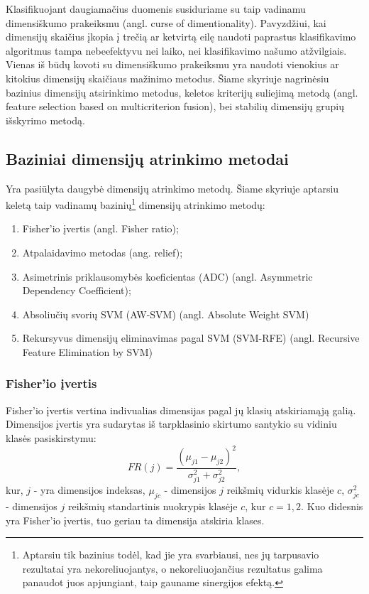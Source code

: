 Klasifikuojant daugiamačius duomenis susiduriame su taip vadinamu dimensiškumo
prakeiksmu (angl. curse of dimentionality). Pavyzdžiui, kai dimensijų skaičius įkopia į
trečią ar ketvirtą eilę naudoti paprastus klasifikavimo algoritmus tampa
nebeefektyvu nei laiko, nei klasifikavimo našumo atžvilgiais. Vienas iš būdų
kovoti su dimensiškumo prakeiksmu
yra naudoti vienokius ar kitokius dimensijų skaičiaus mažinimo metodus. Šiame
skyriuje nagrinėsiu bazinius dimensijų atsirinkimo metodus, keletos 
kriterijų suliejimą metodą (angl.
feature selection based on multicriterion fusion)\cite{yang2011robust}, bei
stabilių dimensijų grupių išskyrimo metodą\cite{Loscalzo:2009:CGS:1557019.1557084}.

\subsection{Baziniai dimensijų atrinkimo metodai}

Yra pasiūlyta daugybė dimensijų atrinkimo metodų. Šiame skyriuje aptarsiu
keletą taip vadinamų bazinių\footnote{Aptarsiu tik bazinius todėl, kad jie yra 
svarbiausi, nes jų tarpusavio rezultatai yra nekoreliuojantys, o nekoreliuojančius
rezultatus galima panaudot juos apjungiant, taip gauname sinergijos efektą.}
dimensijų atrinkimo metodų: 
\begin{enumerate}
 \item Fisher'io įvertis (angl. Fisher ratio)\cite{Pavlidis:2001:GFC:369133.369228};
 \item Atpalaidavimo metodas\cite{DBLP:journals/ml/Robnik-SikonjaK03} (ang. relief);
 \item Asimetrinis priklausomybės koeficientas\cite{Shannon:2001:MTC:584091.584093} (ADC) (angl.
 Asymmetric Dependency Coefficient);
 \item Absoliučių svorių SVM\cite{vapnik2000nature} (AW-SVM) (angl. Absolute Weight SVM)
 \item Rekursyvus dimensijų eliminavimas pagal SVM\cite{Guyon:2002:GSC:599613.599671} (SVM-RFE) (angl. Recursive
 Feature Elimination by SVM)
\end{enumerate}

\subsubsection{Fisher'io įvertis}

Fisher'io įvertis vertina indivualias dimensijas pagal jų klasių atskiriamąją 
galią. Dimensijos įvertis yra sudarytas iš tarpklasinio skirtumo santykio su 
vidiniu klasės pasiskirstymu:
\begin{equation}
 FR(j) = \frac{(\mu_{j1} - \mu_{j2})^2}{\sigma_{j1}^2 + \sigma_{j2}^2},
\end{equation}
kur, $j$ - yra dimensijos indeksas, $\mu_{jc}$ - dimensijos $j$ reikšmių vidurkis
klasėje $c$, $\sigma_{jc}^2$ - dimensijos $j$ reikšmių standartinis nuokrypis
klasėje $c$, kur $c={1,2}$. Kuo didesnis yra Fisher'io įvertis, tuo geriau ta
dimensija atskiria klases.


